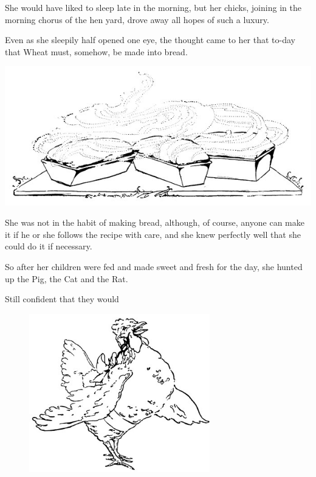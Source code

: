 \documentclass[letterpaper, 10pt, openany]{memoir}
\begin{document}
She would have liked to sleep late in the morning, but her chicks, joining in the morning chorus of
the hen yard, drove away all hopes of such a luxury.

\newpage
Even as she sleepily half opened one eye, the thought came to her that to-day that Wheat must,
somehow, be made into bread.

\begin{center}
	\includegraphics[width=\textwidth]{image_029.jpg}
\end{center}

\vspace{\onelineskip}

She was not in the habit of making bread, although, of course, anyone can make it if he or she
follows the recipe with care, and she knew perfectly well that she could do it if necessary.

\newpage
So after her children were fed and made sweet and fresh for the day, she hunted up the Pig, the
Cat and the Rat.

\vspace{\onelineskip}

Still confident that they would

\begin{figure}
	\includegraphics[width=0.7\textwidth]{image_030.jpg}
\end{figure}
\end{document}
